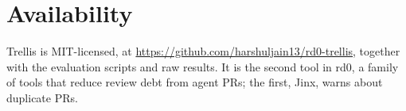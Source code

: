 \documentclass[sigconf]{acmart}
\begin{document}
\section{Availability}
Trellis is MIT-licensed, at \url{https://github.com/harshuljain13/rd0-trellis}, together with the evaluation scripts and raw results. It is the second tool in rd0, a family of tools that reduce review debt from agent PRs; the first, Jinx, warns about duplicate PRs.



\end{document}
